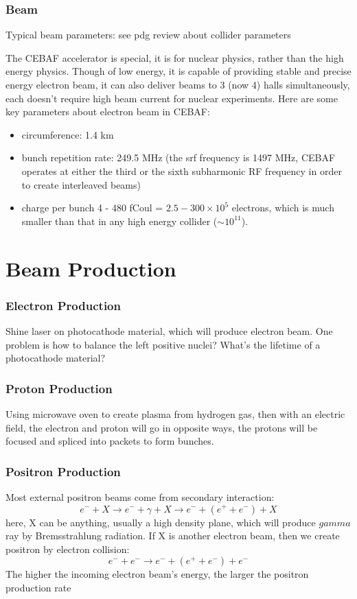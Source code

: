 \subsubsection{Beam}
Typical beam parameters: see pdg review about collider parameters

The CEBAF accelerator is special, it is for nuclear physics, rather than
the high energy physics. Though of low energy, it is capable of providing 
stable and precise energy electron beam, it can also deliver beams to 3 (now 4)
halls simultaneously, each doesn't require high beam current for nuclear 
experiments. Here are some key parameters about electron beam in CEBAF:
\begin{itemize}
    \item circumference: 1.4 km
    \item bunch repetition rate: 249.5 MHz (the srf frequency is 1497 MHz, 
	CEBAF operates at either the third or the sixth subharmonic RF frequency
	in order to create interleaved beams)
    \item charge per bunch 4 - 480 fCoul = $2.5 - 300 \times 10^5$  electrons,
	which is much smaller than that in any high energy collider ($\sim 10^{11}$).
\end{itemize}

\section{Beam Production}

\subsubsection{Electron Production}
Shine laser on photocathode material, which will produce electron beam. One 
problem is how to balance the left positive nuclei? What's the lifetime of 
a photocathode material?

\subsubsection{Proton Production}
Using microwave oven to create plasma from hydrogen gas, then with an electric
field, the electron and proton will go in opposite ways, the protons will be
focused and spliced into packets to form bunches.

\subsubsection{Positron Production}
Most external positron beams come from secondary interaction:
$$ e^- + X \rightarrow e^- + \gamma + X \rightarrow e^- + (e^+ + e^-) + X $$
here, X can be anything, usually a high density plane, which will produce 
$gamma$ ray by Bremsstrahlung radiation. If X is another electron beam, then
we create positron by electron collision:
$$ e^- + e^- \rightarrow e^- + (e^+ + e^-) + e^- $$
The higher the incoming electron beam's energy, the larger the positron 
production rate

